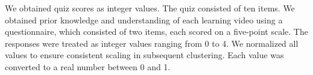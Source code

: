 \begin{deletedblock}
We obtained quiz scores as integer values.
The quiz consisted of ten items.
We obtained prior knowledge and understanding of each learning video using a questionnaire, which consisted of two items, each scored on a five-point scale.
The responses were treated as integer values ranging from 0 to 4.
We normalized all values to ensure consistent scaling in subsequent clustering.
Each value was converted to a real number between 0 and 1.
\end{deletedblock}
